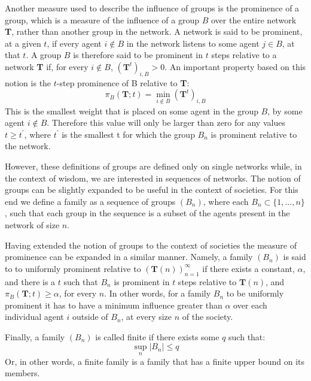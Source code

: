 \documentclass{article}
\newcommand{\T}{\textbf{T}}
\newcommand{\Soc}{(\T(n))^{\infty}_{n=1}}
\begin{document}
Another measure used to describe the influence of groups is the prominence of a group, which is a measure of the influence of a group $B$ over the entire network \textbf{T}, rather than another group in the network.
 A network is said to be prominent, at a given $t$, if every agent $i \notin B$ in the network listens to some agent $j\in B$, at that $t$.
A group $B$ is therefore said to be prominent in $t$ steps relative to a network \textbf{T} if, for every $i \notin B$, $(\textbf{T}^{t})_{i,B} > 0$. An important property based on this notion is the $t$-step prominence of B relative to \textbf{T}: 
\begin{equation}
    \pi_B(\textbf{T}; t) = \min_{i\notin B} (\textbf{T}^{t})_{i,B}
\end{equation}
This is the smallest weight that is placed on some agent in the group $B$, by some agent $i\notin B$. Therefore this value will only be larger than zero for any values $t \geq t^{\prime}$, where $t^{\prime}$ is the smallest t for which
the group $B_n$ is prominent relative to the network.
\newline

However, these definitions of groups are defined only on single networks while, in the context of wisdom, we are interested in sequences of networks. The notion of groups can be slightly expanded to be useful in the context of societies. For this end we define a family as a sequence of groups $(B_n)$, where each $B_n \subset \{1, ..., n\}$, such that each group in the sequence is a subset of the agents present in the network of size $n$.

Having extended the notion of groups to the context of societies the measure of prominence can be expanded in a similar manner. Namely, a family $(B_n)$ is said to to uniformly prominent relative to $\Soc$ if there exists a constant, $\alpha$, and there is a $t$ such that $B_n$ is prominent in $t$ steps relative to $\T(n)$, and $\pi_B(\textbf{T}; t) \geq \alpha$, for every $n$. In other words, for a family $B_n$ to be uniformly prominent it has to have a minimum influence greater than $\alpha$ over each individual agent $i$ outside of $B_n$, at every size $n$ of the society.

\noindent Finally, a family $(B_n)$ is called finite if there exists some $q$ such that:
\begin{equation*}
    \sup_n |B_n| \leq q
\end{equation*}
Or, in other words, a finite family is a family that has a finite upper bound on its members.
\end{document}
